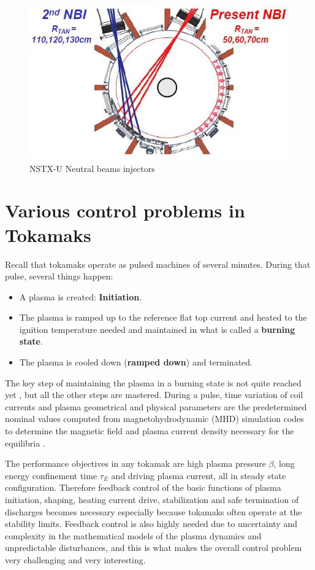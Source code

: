 \documentclass[12pt,lot, lof]{puthesis}
\begin{document}
\begin{figure}
\centering
\includegraphics[width= 0.6\linewidth]{NSTXU}
\caption{NSTX-U Neutral beams injectors}
\label{nstxu}
\end{figure}



\section{Various control problems in Tokamaks}

Recall that tokamaks operate as pulsed machines of several minutes. During that pulse, several things happen:
\begin{itemize}
\item A plasma is created: \textbf{Initiation}.
\item The plasma is ramped up to the reference flat top current and heated to the ignition temperature needed and maintained in what is called a \textbf{burning state}.
\item The plasma is cooled down (\textbf{ramped down}) and terminated.
\end{itemize}

The key step of maintaining the plasma in a burning state is not quite reached yet \cite{Green03}, but all the other steps are mastered. During a pulse, time variation of coil currents and plasma geometrical and physical parameters are the predetermined nominal values computed from magnetohydrodynamic (MHD) simulation codes to determine the magnetic field and plasma current density necessary for the equilibria \cite{Lao85, Takeda91, Lao05}.

The performance objectives in any tokamak are high plasma pressure $\beta$, long energy confinement time $\tau_E$ and driving plasma current, all in steady state configuration. Therefore feedback control of the basic functions of plasma initiation, shaping, heating current drive, stabilization and safe termination of discharges becomes necessary especially because tokamaks often operate at the stability limits. Feedback control is also highly needed due to uncertainty and complexity in the mathematical models of the plasma dynamics and unpredictable disturbances, and this is what makes the overall control problem very challenging and very interesting.
\end{document}
